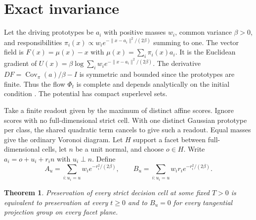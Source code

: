 \documentclass[final,5p,twocolumn]{elsarticle}
\newtheorem{theorem}{Theorem}
\begin{document}
\section{Exact invariance}

Let the driving prototypes be $a_i$ with positive masses $w_i$, common
variance $\beta>0$, and responsibilities
$\pi_i(x)\propto w_i e^{-\|x-a_i\|^2/(2\beta)}$ summing to one.
The vector field is $F(x)=\mu(x)-x$ with $\mu(x)=\sum_i\pi_i(x)a_i$.
It is the Euclidean gradient of
$U(x)=\beta\log\sum_i w_i e^{-\|x-a_i\|^2/(2\beta)}$.
The derivative
$DF=\operatorname{Cov}_{\pi}(a)/\beta-I$ is symmetric and bounded
since the prototypes are finite. Thus the flow $\Phi_t$ is complete
and depends analytically on the initial condition \cite{carrillo}.
The potential has compact superlevel sets.

Take a finite readout given by the maximum of distinct affine scores.
Ignore scores with no full-dimensional strict cell. With one distinct
Gaussian prototype per class, the shared quadratic term cancels to
give such a readout. Equal masses give the ordinary Voronoi diagram.
Let $H$ support a facet between full-dimensional cells, let $n$ be a
unit normal, and choose $o\in H$. Write $a_i=o+u_i+r_i n$ with
$u_i\perp n$. Define
\begin{equation}
 A_u=\sum_{i:u_i=u} w_i e^{-r_i^2/(2\beta)},\qquad
 B_u=\sum_{i:u_i=u} w_i r_i e^{-r_i^2/(2\beta)}.
 \label{eq:letter-balance}
\end{equation}

\begin{theorem}
\label{thm:letter}
Preservation of every strict decision cell at some fixed $T>0$ is
equivalent to preservation at every $t\ge0$ and to $B_u=0$ for
every tangential projection group on every facet plane.
\end{theorem}
\end{document}
